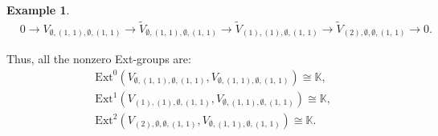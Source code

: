 \documentclass[openany, a4paper]{amsbook}
\newtheorem{thm}{Theorem}[chapter]
\theoremstyle{definition}
\newtheorem{exmp}[thm]{Example}
\numberwithin{equation}{chapter}
\newcommand{\T}[1]{{\mathbb{T}}_{\aleph_{#1}}}
\newcommand{\Ext}[4]{\mathrm{Ext}^{#1}_{#2}({#3}, {#4})}
\begin{document}
\begin{exmp}
    \begin{align*}
        &0 \to 
        V_{ \emptyset, (1,\,1), \emptyset, (1,\,1) }\to
        \tilde{V}_{ \emptyset, (1,\,1), \emptyset, (1,\,1) }
        \to
        \tilde{V}_{ (1), (1), \emptyset, (1,\,1) }
        \to
        \tilde{V}_{ (2), \emptyset, \emptyset, (1,\,1) }
        \to 0.
    \end{align*}

    Thus, all the nonzero Ext-groups are:
    \begin{align*}
        &\Ext{0}{}{V_{ \emptyset, (1,\,1), \emptyset, (1,\,1) }}{V_{ \emptyset, (1,\,1), \emptyset, (1,\,1) }} \cong \mathbb{K}, \\
        &\Ext{1}{}{ V_{(1), (1), \emptyset, (1,\,1)}}{V_{ \emptyset, (1,\,1), \emptyset, (1,\,1) }} \cong \mathbb{K},
        \\
        &\Ext{2}{}{ V_{(2), \emptyset, \emptyset, (1,\,1)}}{V_{ \emptyset, (1,\,1), \emptyset, (1,\,1)}} \cong \mathbb{K}.
    \end{align*}
\end{exmp}

\end{document}

